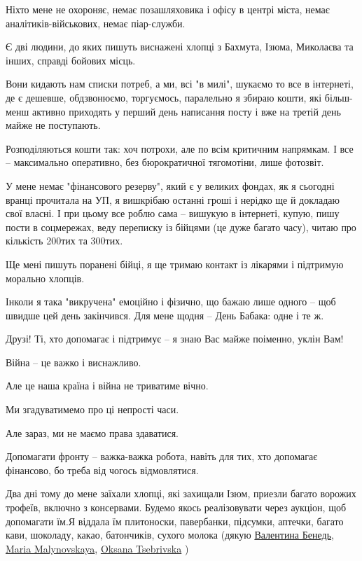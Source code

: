Ніхто мене не охороняє, немає позашляховика і офісу в центрі міста, немає
аналітиків-військових, немає піар-служби.

Є дві людини, до яких пишуть виснажені хлопці з Бахмута, Ізюма, Миколаєва та
інших, справді бойових місць.

Вони кидають нам списки потреб, а ми, всі "в милі", шукаємо то все в інтернеті,
де є дешевше, обдзвонюємо, торгуємось, паралельно я збираю кошти, які
більш-менш активно приходять у перший день написання посту і вже на третій день
майже не поступають.

Розподіляються кошти так: хоч потрохи, але по всім критичним напрямкам. І все
-- максимально оперативно, без бюрократичної тягомотіни, лише фотозвіт. 

У мене немає "фінансового резерву", який є у великих фондах, як я сьогодні
вранці прочитала на УП, я вишкрібаю останні гроші і нерідко ще й докладаю свої
власні. І при цьому все роблю сама -- вишукую в інтернеті, купую, пишу пости в
соцмережах, веду переписку із бійцями (це дуже багато часу), читаю про
кількість 200тих та 300тих. 

Ще мені пишуть поранені бійці, я ще тримаю контакт із лікарями і підтримую
морально хлопців.


Інколи я така "викручена" емоційно і фізично, що бажаю лише одного -- щоб
швидше цей день закінчився. Для мене щодня -- День Бабака: одне і те ж. 

Друзі! Ті, хто допомагає і підтримує -- я знаю Вас майже поіменно, уклін Вам!

Війна -- це важко і виснажливо.

Але це наша країна і війна не триватиме вічно.

Ми згадуватимемо про ці непрості часи.

Але зараз, ми не маємо права здаватися. 

Допомагати фронту -- важка-важка робота, навіть для тих, хто допомагає
фінансово, бо треба від чогось відмовлятися.

Два дні тому до мене заїхали хлопці, які захищали Ізюм, приезли багато ворожих
трофеїв, включно з консервами. Будемо якось реалізовувати через аукціон, щоб
допомагати їм.Я віддала їм плитоноски, павербанки, підсумки, аптечки, багато
кави, шоколаду, какао, батончиків, сухого молока (дякую \href{https://www.facebook.com/profile.php?id=100000946332209}{Валентина Бенедь},
\href{https://www.facebook.com/maria.mali.7140497}{Maria Malynovskaya}, 
\href{https://www.facebook.com/oksana.tsebrivska}{Oksana Tsebrivska} )

